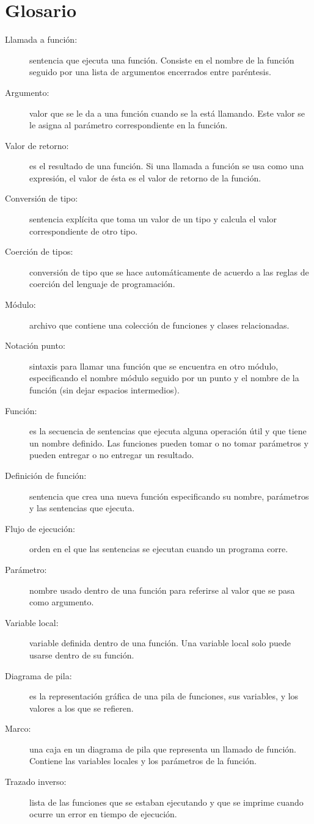 \section{Glosario}
\begin{description}
\item [{Llamada a función:}] sentencia que ejecuta una función. Consiste
en el nombre de la función seguido por una lista de argumentos encerrados
entre paréntesis.
\item [{Argumento:}] valor que se le da a una función cuando se la está
llamando. Este valor se le asigna al parámetro correspondiente en
la función.
\item [{Valor de retorno:}] es el resultado de una función. Si una llamada
a función se usa como una expresión, el valor de ésta es el valor
de retorno de la función.
\item [{Conversión de tipo:}] sentencia explícita que toma un valor de
un tipo y calcula el valor correspondiente de otro tipo.
\item [{Coerción de tipos:}] conversión de tipo que se hace automáticamente
de acuerdo a las reglas de coerción del lenguaje de programación.
\item [{Módulo:}] archivo que contiene una colección de funciones y clases
relacionadas.
\item [{Notación punto:}] sintaxis para llamar una función que se encuentra
en otro módulo, especificando el nombre módulo seguido por un punto
y el nombre de la función (sin dejar espacios intermedios).
\item [{Función:}] es la secuencia de sentencias que ejecuta alguna operación
útil y que tiene un nombre definido. Las funciones pueden tomar o
no tomar parámetros y pueden entregar o no entregar un resultado.
\item [{Definición de función:}] sentencia que crea una nueva función
especificando su nombre, parámetros y las sentencias que ejecuta.
\item [{Flujo de ejecución:}] orden en el que las sentencias se ejecutan
cuando un programa corre.
\item [{Parámetro:}] nombre usado dentro de una función para referirse
al valor que se pasa como argumento.
\item [{Variable local:}] variable definida dentro de una función. Una
variable local solo puede usarse dentro de su función.
\item [{Diagrama de pila:}] es la representación gráfica de una pila de
funciones, sus variables, y los valores a los que se refieren.
\item [{Marco:}] una caja en un diagrama de pila que representa un llamado
de función. Contiene las variables locales y los parámetros de la
función.
\item [{Trazado inverso:}] lista de las funciones que se estaban ejecutando
y que se imprime cuando ocurre un error en tiempo de ejecución.


\end{description}

